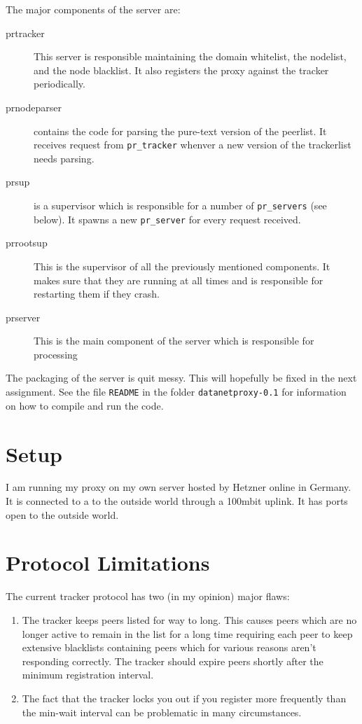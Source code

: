 \documentclass{sig-alternate}
\begin{document}
The major components of the server are:
\begin{description}
\item[prtracker] This server is responsible maintaining the domain
    whitelist, the nodelist, and the node blacklist. It also
    registers the proxy against the tracker periodically.
\item[prnodeparser] contains the code for parsing the pure-text
  version of the peerlist. It receives request from \verb!pr_tracker!
  whenver a new version of the trackerlist needs parsing.
\item[prsup] is a supervisor which is responsible for a number of
  \verb!pr_servers! (see below). It spawns a new \verb!pr_server! for
  every request received.
\item[prrootsup] This is the supervisor of all the previously
  mentioned components. It makes sure that they are running at all
  times and is responsible for restarting them if they crash.
\item[prserver] This is the main component of the server which is
  responsible for processing
\end{description}

The packaging of the server is quit messy. This will hopefully be
fixed in the next assignment. See the file \verb!README! in the folder
\verb!datanetproxy-0.1! for information on how to compile and run the
code.


\section{Setup}
I am running my proxy on my own server hosted by Hetzner online in
Germany. It is connected to a to the outside world through a 100mbit
uplink. It has ports open to the outside world.

\section{Protocol Limitations}
The current tracker protocol has two (in my opinion) major flaws:
\begin{enumerate}
\item The tracker keeps peers listed for way to long. This causes
  peers which are no longer active to remain in the list for a long
  time requiring each peer to keep extensive blacklists containing
  peers which for various reasons aren't responding correctly. The
  tracker should expire peers shortly after the minimum registration
  interval.
\item The fact that the tracker locks you out if you register more
  frequently than the min-wait interval can be problematic in many
  circumstances.
\end{enumerate}
\end{document}
